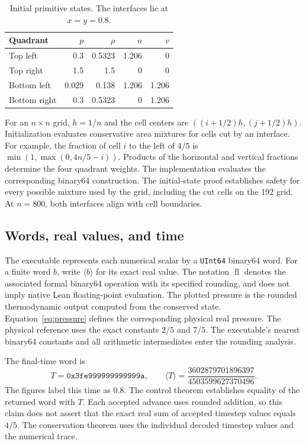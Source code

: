 \documentclass[11pt]{article}
\newcommand{\code}[1]{\texttt{#1}}
\newcommand{\val}[1]{\langle #1\rangle}
\newcommand{\fl}{\operatorname{fl}}
\begin{document}
\begin{table}[htbp]
\centering
\begin{tabular}{lrrrr}
\toprule
Quadrant & $p$ & $\rho$ & $u$ & $v$\\
\midrule
Top left & 0.3 & 0.5323 & 1.206 & 0\\
Top right & 1.5 & 1.5 & 0 & 0\\
Bottom left & 0.029 & 0.138 & 1.206 & 1.206\\
Bottom right & 0.3 & 0.5323 & 0 & 1.206\\
\bottomrule
\end{tabular}
\caption{Initial primitive states.  The interfaces lie at $x=y=0.8$.}
\label{tab:initial}
\end{table}

For an $n\times n$ grid, $h=1/n$ and the cell centers are $((i+1/2)h,(j+1/2)h)$.  Initialization evaluates conservative area mixtures for cells cut by an interface.  For example, the fraction of cell $i$ to the left of $4/5$ is $\min(1,\max(0,4n/5-i))$.  Products of the horizontal and vertical fractions determine the four quadrant weights.  The implementation evaluates the corresponding binary64 construction.  The initial-state proof establishes safety for every possible mixture used by the grid, including the cut cells on the 192 grid.  At $n=800$, both interfaces align with cell boundaries.

\subsection{Words, real values, and time}

The executable represents each numerical scalar by a \code{UInt64} binary64 word.  For a finite word $b$, write $\val{b}$ for its exact real value.  The notation $\fl$ denotes the associated formal binary64 operation with its specified rounding, and does not imply native Lean floating-point evaluation.  The plotted pressure is the rounded thermodynamic output computed from the conserved state.  Equation~\eqref{eq:pressure} defines the corresponding physical real pressure.  The physical reference uses the exact constants $2/5$ and $7/5$.  The executable's nearest binary64 constants and all arithmetic intermediates enter the rounding analysis.

The final-time word is
\begin{equation}
T=\code{0x3fe999999999999a},\qquad
\val{T}=\frac{3602879701896397}{4503599627370496}.
\end{equation}
The figures label this time as $0.8$.  The control theorem establishes equality of the returned word with $T$.  Each accepted advance uses rounded addition, so this claim does not assert that the exact real sum of accepted timestep values equals $4/5$.  The conservation theorem uses the individual decoded timestep values and the numerical trace.
\end{document}

